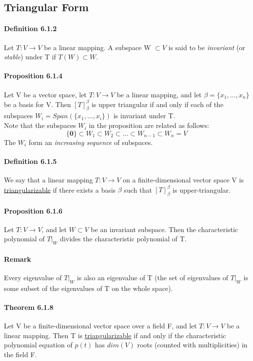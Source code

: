 \documentclass[11pt]{article}
\newcommand{\ti}[1]{\textit{#1}}
\newcommand{\tb}[1]{\textbf{#1}}
\newcommand{\under}[1]{\underline{#1}}
\newcommand{\vo}[0]{\tb{0}}
\begin{document}
{\subsection{Triangular Form}
\paragraph{Definition 6.1.2} Let $T: V\rightarrow V$ be a linear mapping. A subspace W $\subset V$ is said to be \ti{invariant} (or \ti{stable}) under T if $T(W) \subset W$.
\paragraph{Proposition 6.1.4}
Let V be a vector space, let $T: V \rightarrow V$ be a linear mapping, and let $\beta = \{x_1, \hdots, x_n\}$ be a basis for V. Then $[T]_\beta^\beta$ is upper triangular if and only if each of the subspaces $W_i = Span(\{x_1,\hdots,x_i\})$ is invariant under T.\\
Note that the subspaces $W_i$ in the proposition are related as follows:
$$\{\vo\} \subset W_1 \subset W_2 \subset \hdots \subset W_{n-1} \subset W_n = V$$
The $W_i$ form an \ti{increasing sequence} of subspaces.
\paragraph{Definition 6.1.5} We say that a linear mapping $T: V \rightarrow V$ on a finite-dimensional vector space V is \under{triangularizable} if there exists a basis $\beta$ such that $[T]_\beta^\beta$ is upper-triangular.
\paragraph{Proposition 6.1.6} Let $T: V \rightarrow V$, and let $W \subset V$ be an invariant subspace. Then the characteristic polynomial of $T|_W$ divides the characteristic polynomial of T.
\paragraph{Remark} Every eigenvalue of $T|_W$ is also an eigenvalue of T (the set of eigenvalues of $T|_W$ is some subset of the eigenvalues of T on the whole space).
\paragraph{Theorem 6.1.8} Let V be a finite-dimensional vector space over a field F, and let $T: V \rightarrow V$ be a linear mapping. Then T is \under{triangularizable} if and only if the characteristic polynomial equation of $p(t)$ has $dim(V)$ roots (counted with multiplicities) in the field F.
}
\end{document}
